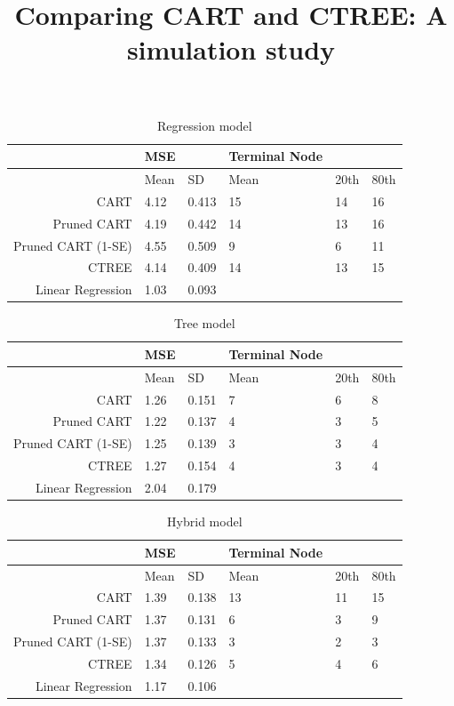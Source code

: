 \documentclass{article}
\title{Comparing CART and CTREE: A simulation study}
\begin{document}


\maketitle


\begin{table}[ht]
\centering
\begin{tabular}{rlllll}
  \hline
 & MSE &  & Terminal Node &  &  \\ 
  \hline
 & Mean & SD & Mean & 20th & 80th \\ 
  CART & 4.12 & 0.413 & 15 & 14 & 16 \\ 
  Pruned CART & 4.19 & 0.442 & 14 & 13 & 16 \\ 
  Pruned CART (1-SE) & 4.55 & 0.509 & 9 & 6 & 11 \\ 
  CTREE & 4.14 & 0.409 & 14 & 13 & 15 \\ 
  Linear Regression & 1.03 & 0.093 &  &  &  \\ 
   \hline
\end{tabular}
\caption{Regression model} 
\end{table}

\begin{table}[ht]
\centering
\begin{tabular}{rlllll}
  \hline
 & MSE &  & Terminal Node &  &  \\ 
  \hline
 & Mean & SD & Mean & 20th & 80th \\ 
  CART & 1.26 & 0.151 & 7 & 6 & 8 \\ 
  Pruned CART & 1.22 & 0.137 & 4 & 3 & 5 \\ 
  Pruned CART (1-SE) & 1.25 & 0.139 & 3 & 3 & 4 \\ 
  CTREE & 1.27 & 0.154 & 4 & 3 & 4 \\ 
  Linear Regression & 2.04 & 0.179 &  &  &  \\ 
   \hline
\end{tabular}
\caption{ Tree model} 
\end{table}

\begin{table}[ht]
\centering
\begin{tabular}{rlllll}
  \hline
 & MSE &  & Terminal Node &  &  \\ 
  \hline
 & Mean & SD & Mean & 20th & 80th \\ 
  CART & 1.39 & 0.138 & 13 & 11 & 15 \\ 
  Pruned CART & 1.37 & 0.131 & 6 & 3 & 9 \\ 
  Pruned CART (1-SE) & 1.37 & 0.133 & 3 & 2 & 3 \\ 
  CTREE & 1.34 & 0.126 & 5 & 4 & 6 \\ 
  Linear Regression & 1.17 & 0.106 &  &  &  \\ 
   \hline
\end{tabular}
\caption{Hybrid model} 
\end{table}
\end{document}

